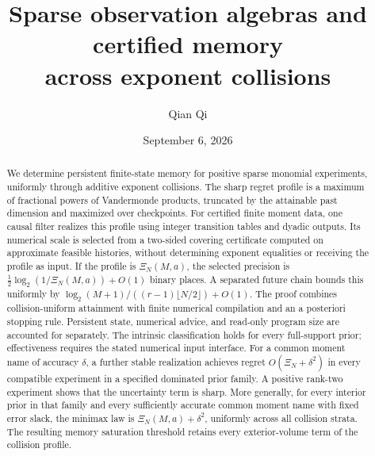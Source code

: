 \documentclass[11pt]{amsart}
\title[Certified memory across exponent collisions]{Sparse observation algebras and certified memory\\ across exponent collisions}
\author{Qian Qi}
\date{September 6, 2026}
\theoremstyle{definition}\newtheorem{definition}[theorem]{Definition}
\theoremstyle{remark}\newtheorem{remark}[theorem]{Remark}
\begin{document}
\begin{abstract}
We determine persistent finite-state memory for positive sparse monomial
experiments, uniformly through additive exponent collisions. The sharp
regret profile is a maximum of fractional powers of Vandermonde products,
truncated by the attainable past dimension and maximized over checkpoints.
For certified finite moment data, one causal filter realizes this profile
using integer transition tables and dyadic outputs. Its numerical scale
is selected from a two-sided covering certificate computed on approximate
feasible histories, without determining exponent equalities or receiving
the profile as input. If the profile is $\Xi_N(M,a)$, the selected
precision is $\frac12\log_2(1/\Xi_N(M,a))+O(1)$ binary places.
A separated future chain bounds this uniformly by
$\log_2(M+1)/((r-1)\lfloor N/2\rfloor)+O(1)$.
The proof combines collision-uniform attainment with finite numerical
compilation and an a posteriori stopping rule. Persistent state, numerical
advice, and read-only program size are accounted for separately.
The intrinsic classification holds for every full-support prior;
effectiveness requires the stated numerical input interface.
For a common moment name of accuracy $\delta$, a further stable realization
achieves regret $O(\Xi_N+\delta^2)$ in every compatible experiment in a
specified dominated prior family. A positive rank-two experiment
shows that the uncertainty term is sharp. More generally, for every
interior prior in that family and every sufficiently accurate common
moment name with fixed error slack, the minimax law is
$\Xi_N(M,a)+\delta^2$, uniformly across all collision strata.
The resulting memory saturation threshold retains every exterior-volume
term of the collision profile.
\end{abstract}
\maketitle














\appendix








\end{document}
